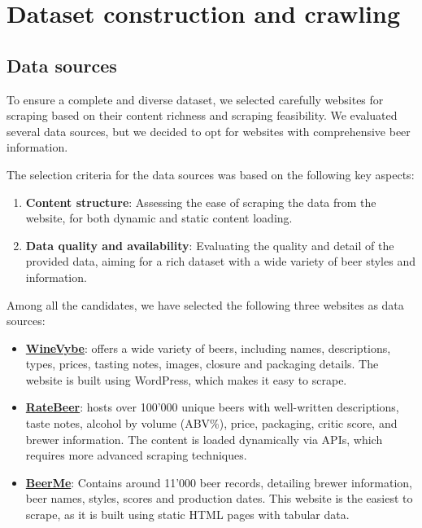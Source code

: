 \section{Dataset construction and crawling}
\label{sec:dataset}

\subsection{Data sources}

To ensure a complete and diverse dataset, we selected carefully websites for scraping based on their content richness and scraping feasibility. We evaluated several data sources, but we decided to opt for websites with comprehensive beer information.

The selection criteria for the data sources was based on the following key aspects:

\begin{enumerate}
  \item \textbf{Content structure}: Assessing the ease of scraping the data from the website, for both dynamic and static content loading.
  \item \textbf{Data quality and availability}: Evaluating the quality and detail of the provided data, aiming for a rich dataset with a wide variety of beer styles and information.
\end{enumerate}

Among all the candidates, we have selected the following three websites as data sources:

\begin{itemize}
  \item \href{https://winevybe.com/}{\textbf{WineVybe}}: offers a wide variety of beers, including names, descriptions, types, prices, tasting notes, images, closure and packaging details. The website is built using WordPress, which makes it easy to scrape.
  \item \href{https://www.ratebeer.com/}{\textbf{RateBeer}}: hosts over 100'000 unique beers with well-written descriptions, taste notes, alcohol by volume (ABV\%), price, packaging, critic score, and brewer information. The content is loaded dynamically via APIs, which requires more advanced scraping techniques.
  \item \href{https://beerme.com/beerlist.php}{\textbf{BeerMe}}: Contains around 11'000 beer records, detailing brewer information, beer names, styles, scores and production dates. This website is the easiest to scrape, as it is built using static HTML pages with tabular data.
\end{itemize}

